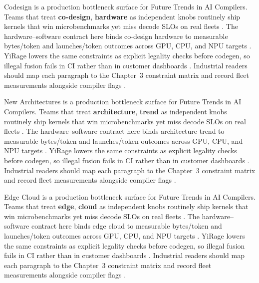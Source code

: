 Codesign is a production bottleneck surface for Future Trends in AI Compilers. Teams that treat \textbf{co-design}, \textbf{hardware} as independent knobs routinely ship kernels that win microbenchmarks yet miss decode SLOs on real fleets \citep{nvidia2024cudagraphs,taxbreak2026}. The hardware--software contract here binds co-design hardware to measurable bytes/token and launches/token outcomes across GPU, CPU, and NPU targets \citep{liu2024deepseekv3,memoryfloor2026}. YiRage lowers the same constraints as explicit legality checks before codegen, so illegal fusion fails in CI rather than in customer dashboards \citep{patel2025llminference,nvidia2022hopper}. Industrial readers should map each paragraph to the Chapter~3 constraint matrix and record fleet measurements alongside compiler flags \citep{taxbreak2026,semianalysis2024tma}.

New Architectures is a production bottleneck surface for Future Trends in AI Compilers. Teams that treat \textbf{architecture}, \textbf{trend} as independent knobs routinely ship kernels that win microbenchmarks yet miss decode SLOs on real fleets \citep{liu2024deepseekv3,memoryfloor2026}. The hardware--software contract here binds architecture trend to measurable bytes/token and launches/token outcomes across GPU, CPU, and NPU targets \citep{patel2025llminference,nvidia2022hopper}. YiRage lowers the same constraints as explicit legality checks before codegen, so illegal fusion fails in CI rather than in customer dashboards \citep{taxbreak2026,semianalysis2024tma}. Industrial readers should map each paragraph to the Chapter~3 constraint matrix and record fleet measurements alongside compiler flags \citep{memoryfloor2026,amd2024xdna}.

Edge Cloud is a production bottleneck surface for Future Trends in AI Compilers. Teams that treat \textbf{edge}, \textbf{cloud} as independent knobs routinely ship kernels that win microbenchmarks yet miss decode SLOs on real fleets \citep{patel2025llminference,nvidia2022hopper}. The hardware--software contract here binds edge cloud to measurable bytes/token and launches/token outcomes across GPU, CPU, and NPU targets \citep{taxbreak2026,semianalysis2024tma}. YiRage lowers the same constraints as explicit legality checks before codegen, so illegal fusion fails in CI rather than in customer dashboards \citep{memoryfloor2026,amd2024xdna}. Industrial readers should map each paragraph to the Chapter~3 constraint matrix and record fleet measurements alongside compiler flags \citep{nvidia2022hopper,amd2024aie}.

